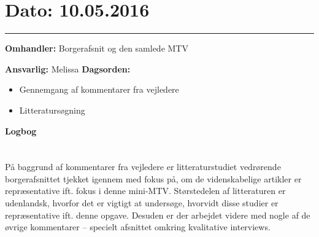 

\section{Dato: 10.05.2016}
\hrule

\textbf{Omhandler:} Borgerafsnit og den samlede MTV


\textbf{Ansvarlig:} Melissa
\textbf{Dagsorden:}
\begin{itemize}
	\item Gennemgang af kommentarer fra vejledere
	\item Litteratursøgning 
\end{itemize}

\textbf{Logbog}
\\
\\ \\
På baggrund af kommentarer fra vejledere er litteraturstudiet vedrørende borgerafsnittet tjekket igennem med fokus på, om de videnskabelige artikler er repræsentative ift. fokus i denne mini-MTV. Størstedelen af litteraturen er udenlandsk, hvorfor det er vigtigt at undersøge, hvorvidt disse studier er repræsentative ift. denne opgave. Desuden er der arbejdet videre med nogle af de øvrige kommentarer – specielt afsnittet omkring kvalitative interviews. 